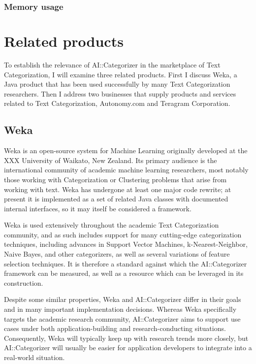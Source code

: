 \subsubsection{Memory usage}

\section{Related products}

To establish the relevance of AI::Categorizer in the marketplace of
Text Categorization, I will examine three related products.  First I
discuss Weka, a Java product that has been used successfully by many
Text Categorization researchers.  Then I address two businesses that
supply products and services related to Text Categorization,
Autonomy.com and Teragram Corporation.

\subsection{Weka}

Weka is an open-source system for Machine Learning originally
developed at the XXX University of Waikato, New Zealand.  Its primary
audience is the international community of academic machine learning
researchers, most notably those working with Categorization or
Clustering problems that arise from working with text.  Weka has
undergone at least one major code rewrite; at present it is
implemented as a set of related Java classes with documented internal
interfaces, so it may itself be considered a framework.

Weka is used extensively throughout the academic Text Categorization
community, and as such includes support for many cutting-edge
categorization techniques, including advances in Support Vector
Machines, k-Nearest-Neighbor, Naive Bayes, and other categorizers, as
well as several variations of feature selection techniques.  It is
therefore a standard against which the AI::Categorizer framework can
be measured, as well as a resource which can be leveraged in its
construction.

Despite some similar properties, Weka and AI::Categorizer differ in
their goals and in many important implementation decisions.  Whereas
Weka specifically targets the academic research community,
AI::Categorizer aims to support use cases under both
application-building and research-conducting situations.
Consequently, Weka will typically keep up with research trends more
closely, but AI::Categorizer will usually be easier for application
developers to integrate into a real-world situation.

